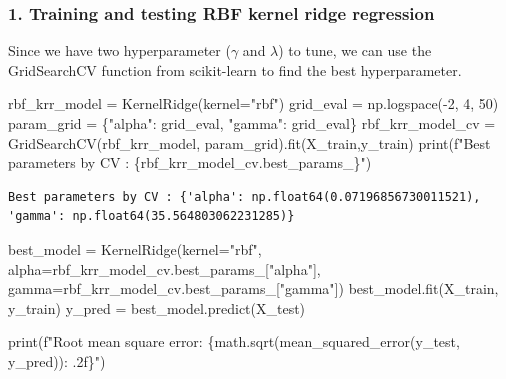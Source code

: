 \documentclass[
  letterpaper,
  DIV=11,
  numbers=noendperiod]{scrartcl}
\newenvironment{Shaded}{\begin{snugshade}}{\end{snugshade}}
\newcommand{\BuiltInTok}[1]{\textcolor[rgb]{0.00,0.23,0.31}{#1}}
\newcommand{\DecValTok}[1]{\textcolor[rgb]{0.68,0.00,0.00}{#1}}
\newcommand{\NormalTok}[1]{\textcolor[rgb]{0.00,0.23,0.31}{#1}}
\newcommand{\OperatorTok}[1]{\textcolor[rgb]{0.37,0.37,0.37}{#1}}
\newcommand{\SpecialCharTok}[1]{\textcolor[rgb]{0.37,0.37,0.37}{#1}}
\newcommand{\SpecialStringTok}[1]{\textcolor[rgb]{0.13,0.47,0.30}{#1}}
\newcommand{\StringTok}[1]{\textcolor[rgb]{0.13,0.47,0.30}{#1}}
\begin{document}
\subsubsection{1. Training and testing RBF kernel ridge
regression}\label{training-and-testing-rbf-kernel-ridge-regression}

Since we have two hyperparameter (\(\gamma\) and \(\lambda\)) to tune,
we can use the GridSearchCV function from scikit-learn to find the best
hyperparameter.

\begin{Shaded}
\begin{Highlighting}[]
\NormalTok{rbf\_krr\_model }\OperatorTok{=}\NormalTok{ KernelRidge(kernel}\OperatorTok{=}\StringTok{"rbf"}\NormalTok{)}
\NormalTok{grid\_eval }\OperatorTok{=}\NormalTok{ np.logspace(}\OperatorTok{{-}}\DecValTok{2}\NormalTok{, }\DecValTok{4}\NormalTok{, }\DecValTok{50}\NormalTok{)}
\NormalTok{param\_grid }\OperatorTok{=}\NormalTok{ \{}\StringTok{"alpha"}\NormalTok{: grid\_eval, }\StringTok{"gamma"}\NormalTok{: grid\_eval\}}
\NormalTok{rbf\_krr\_model\_cv }\OperatorTok{=}\NormalTok{ GridSearchCV(rbf\_krr\_model, param\_grid).fit(X\_train,y\_train)}
\BuiltInTok{print}\NormalTok{(}\SpecialStringTok{f"Best parameters by CV : }\SpecialCharTok{\{}\NormalTok{rbf\_krr\_model\_cv}\SpecialCharTok{.}\NormalTok{best\_params\_}\SpecialCharTok{\}}\SpecialStringTok{"}\NormalTok{)}
\end{Highlighting}
\end{Shaded}

\begin{verbatim}
Best parameters by CV : {'alpha': np.float64(0.07196856730011521), 'gamma': np.float64(35.564803062231285)}
\end{verbatim}

\begin{Shaded}
\begin{Highlighting}[]
\NormalTok{best\_model }\OperatorTok{=}\NormalTok{ KernelRidge(kernel}\OperatorTok{=}\StringTok{"rbf"}\NormalTok{, alpha}\OperatorTok{=}\NormalTok{rbf\_krr\_model\_cv.best\_params\_[}\StringTok{"alpha"}\NormalTok{], gamma}\OperatorTok{=}\NormalTok{rbf\_krr\_model\_cv.best\_params\_[}\StringTok{"gamma"}\NormalTok{])}
\NormalTok{best\_model.fit(X\_train, y\_train)}
\NormalTok{y\_pred }\OperatorTok{=}\NormalTok{ best\_model.predict(X\_test)}

\BuiltInTok{print}\NormalTok{(}\SpecialStringTok{f"Root mean square error: }\SpecialCharTok{\{}\NormalTok{math}\SpecialCharTok{.}\NormalTok{sqrt(mean\_squared\_error(y\_test, y\_pred))}\SpecialCharTok{: .2f\}}\SpecialStringTok{"}\NormalTok{)}
\end{Highlighting}
\end{Shaded}
\end{document}
